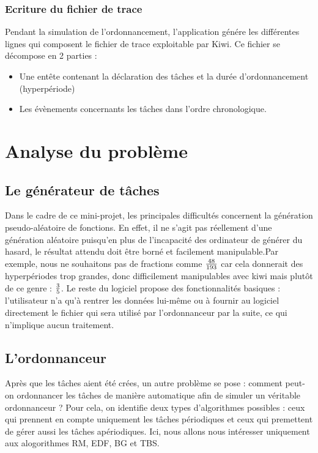 			\subsection{Ecriture du fichier de trace}
				Pendant la simulation de l'ordonnancement, l'application génére les différentes lignes qui composent le fichier de trace exploitable par Kiwi. Ce fichier se décompose en 2 parties :
					\begin{itemize}
						\item Une entête contenant la déclaration des tâches et la durée d'ordonnancement (hyperpériode)
						\item Les évènements concernants les tâches dans l'ordre chronologique.
					\end{itemize}

	
	
	
\chapter{Analyse du problème}
	\section{Le générateur de tâches}
		Dans le cadre de ce mini-projet, les principales difficultés concernent la génération pseudo-aléatoire de fonctions. En effet, il ne s'agit pas réellement d'une génération aléatoire puisqu'en plus de l'incapacité des ordinateur de générer du hasard, le résultat attendu doit être borné et facilement manipulable.Par exemple, nous ne souhaitons pas de fractions comme ${48 \over 193}$ car cela donnerait des hyperpériodes trop grandes, donc difficilement manipulables avec kiwi mais plutôt de ce genre : ${3 \over 5}$.
		Le reste du logiciel propose des fonctionnalités basiques : l'utilisateur n'a qu'à rentrer les données lui-même ou à fournir au logiciel directement le fichier qui sera utilisé par l'ordonnanceur par la suite, ce qui n'implique aucun traitement.

	\section{L'ordonnanceur}
		Après que les tâches aient été crées, un autre problème se pose : comment peut-on ordonnancer les tâches de manière automatique afin de simuler un véritable ordonnanceur ? Pour cela, on identifie deux types d'algorithmes possibles : ceux qui prennent en compte uniquement les tâches périodiques et ceux qui premettent de gérer aussi les tâches apériodiques. Ici, nous allons nous intéresser uniquement aux alogorithmes RM, EDF, BG et TBS.
		
